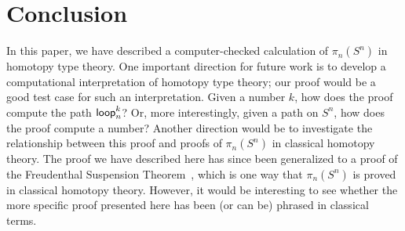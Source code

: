 
\section{Conclusion}

In this paper, we have described a computer-checked calculation of
$\pi_n(S^n)$ in homotopy type theory.  One important direction for
future work is to develop a computational interpretation of homotopy
type theory; our proof would be a good test case for such an
interpretation. Given a number $k$, how does the proof compute the path
$\mathsf{loop}_n^k$?  Or, more interestingly, given a path on $S^n$, how
does the proof compute a number?  Another direction would be to
investigate the relationship between this proof and proofs of
$\pi_n(S^n)$ in classical homotopy theory.  The proof we have described
here has since been generalized to a proof of the Freudenthal Suspension
Theorem~\citep{uf13hott-book}, which is one way that $\pi_n(S^n)$ is proved in classical
homotopy theory.  However, it would be interesting to see whether the
more specific proof presented here has
been (or can be) phrased in classical terms.  
